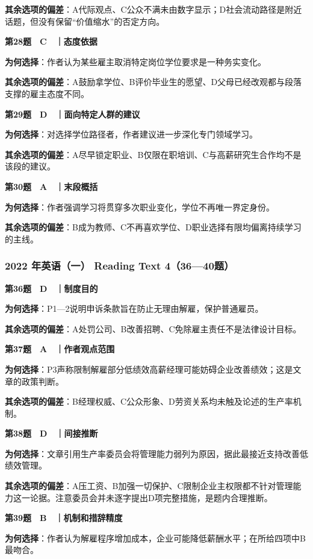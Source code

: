 \documentclass[
  11pt,
]{ctexart}
\begin{document}
\textbf{其余选项的偏差}：A代际观点、C公众不满未由数字显示；D社会流动路径是附近话题，但没有保留``价值缩水''的否定方向。

\textbf{第28题　C　｜态度依据}

\textbf{为何选择}：作者认为某些雇主取消特定岗位学位要求是一种务实变化。

\textbf{其余选项的偏差}：A鼓励拿学位、B评价毕业生的愿望、D父母已经改观都与段落支撑的雇主态度不同。

\textbf{第29题　D　｜面向特定人群的建议}

\textbf{为何选择}：对选择学位路径者，作者建议进一步深化专门领域学习。

\textbf{其余选项的偏差}：A尽早锁定职业、B仅限在职培训、C与高薪研究生合作均不是该段的建议。

\textbf{第30题　A　｜末段概括}

\textbf{为何选择}：作者强调学习将贯穿多次职业变化，学位不再唯一界定身份。

\textbf{其余选项的偏差}：B成为教师、C不再喜欢学位、D职业选择有限均偏离持续学习的主线。

\subsubsection{2022 年英语（一） Reading Text
4（36---40题）}\label{ux5e74ux82f1ux8bedux4e00-reading-text-43640ux9898}

\textbf{第36题　D　｜制度目的}

\textbf{为何选择}：P1---2说明申诉条款旨在防止无理由解雇，保护普通雇员。

\textbf{其余选项的偏差}：A处罚公司、B改善招聘、C免除雇主责任不是法律设计目标。

\textbf{第37题　A　｜作者观点范围}

\textbf{为何选择}：P3声称限制解雇部分低绩效高薪经理可能妨碍企业改善绩效；这是文章的政策判断。

\textbf{其余选项的偏差}：B经理权威、C公众形象、D劳资关系均未触及论述的生产率机制。

\textbf{第38题　D　｜间接推断}

\textbf{为何选择}：文章引用生产率委员会将管理能力弱列为原因，据此最接近支持改善低绩效管理。

\textbf{其余选项的偏差}：A压工资、B加强一切保护、C限制企业主权限都不针对管理能力这一论据。注意委员会并未逐字提出D项完整措施，是题内合理推断。

\textbf{第39题　B　｜机制和措辞精度}

\textbf{为何选择}：作者认为解雇程序增加成本，企业可能降低薪酬水平；在所给四项中B最吻合。
\end{document}
